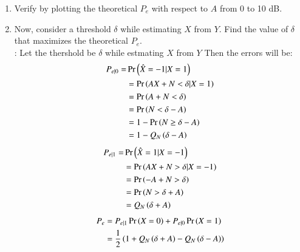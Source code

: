 \documentclass[journal,12pt,twocolumn]{IEEEtran}
\renewcommand\thesection{\arabic{section}}
\begin{document}
\begin{enumerate}[label=\thesection.\arabic*
,ref=\thesection.\theenumi]
\begin{align}
&=Q_N\brak{A}
\end{align}
\begin{align}
P_{e|1}=&\pr{\hat{X} = 1|X=-1}\\
&=\pr{AX+N>0 |X=-1} \\
&=\pr{-A+N>0} \\
&=\pr{N>A} \\
&=Q_N\brak{A} 
\end{align}
Here small transformation used:
\begin{align}
\pr{N<-A}&=\int_{-\infty}^{-A} \frac{1}{\sqrt{2\pi}}e^{-\frac{x^2}{2}} \\
&=\int_{A}^{\infty}  \frac{1}{\sqrt{2\pi}}e^{-\frac{x^2}{2}} \\
&=\pr{N > A}
\end{align}
Now let us use Total probaility theorem:
\begin{align}
P_{e}&=P_{e|1}\pr{X=0}+P_{e|0}\pr{X=1}\\
     &= Q_N\brak{A}\times 0.5+Q_N\brak{A}\times 0.5 \\
     &=Q_N\brak{A}
\end{align}
\item
Verify by plotting  the theoretical $P_e$ with respect to $A$ from 0 to 10 dB.  
%
\item Now, consider a threshold $\delta$  while estimating $X$ from $Y$. Find the value of $\delta$ that maximizes the theoretical $P_e$.\\
\solution:
Let the thershold be $\delta$ while estmating $X$ from $Y$
Then the errors will be:
\begin{align}
P_{e|0}=&\Pr\left(\hat{X} = -1|X=1\right)\\
&=\Pr\left(AX+N<\delta |X=1\right) \\
&=\Pr\left(A+N<\delta\right) \\
&=\Pr\left(N<\delta-A\right) \\
&=1-\Pr\left(N \ge \delta -A\right)\\
&=1-Q_N\left(\delta-A\right)
\end{align}
\begin{align}
P_{e|1}=&\Pr\left(\hat{X} = 1|X=-1\right)\\
&=\Pr\left(AX+N>\delta |X=-1\right) \\
&=\Pr\left(-A+N>\delta\right) \\
&=\Pr\left(N>\delta+A\right) \\
&=Q_N\left(\delta+A\right) 
\end{align}
\begin{align}
P_{e}&=P_{e|1}\pr{X=0}+P_{e|0}\pr{X=1}\\
     &=\frac{1}{2}\brak{1+Q_N\brak{\delta+A}-Q_N\brak{\delta-A}}

\end{align}
\end{enumerate}
\end{document}
